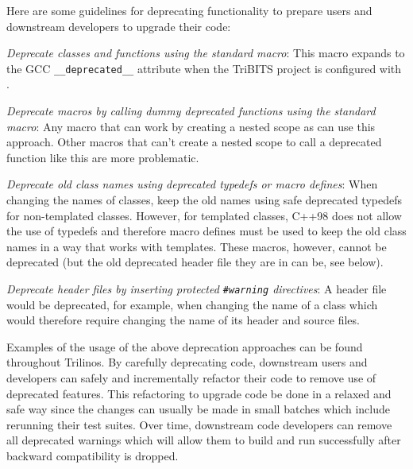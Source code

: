 \documentclass[11pt]{SANDreport}
\begin{document}
Here are some guidelines for deprecating functionality to prepare users and downstream developers to upgrade their code:

\begin{compactitem}

{}\item\textit{Deprecate classes and functions using the standard {} macro}: This macro expands to the GCC {}\texttt{\_\_deprecated\_\_} attribute when the TriBITS project is configured with {}.

{}\item\textit{Deprecate macros by calling dummy deprecated functions using the standard {} macro}: Any macro that can work by creating a nested scope as {} can use this approach.  Other macros that can't create a nested scope to call a deprecated function like this are more problematic.

{}\item\textit{Deprecate old class names using deprecated typedefs or macro defines}: When changing the names of classes, keep the old names using safe deprecated typedefs for non-templated classes.  However, for templated classes, C++98 does not allow the use of typedefs and therefore macro defines must be used to keep the old class names in a way that works with templates.  These macros, however, cannot be deprecated (but the old deprecated header file they are in can be, see below).

{}\item\textit{Deprecate header files by inserting protected {}\texttt{\#warning} directives}: A header file would be deprecated, for example, when changing the name of a class which would therefore require changing the name of its header and source files.

\end{compactitem}

Examples of the usage of the above deprecation approaches can be found throughout Trilinos.  By carefully deprecating code, downstream users and developers can safely and incrementally refactor their code to remove use of deprecated features.  This refactoring to upgrade code be done in a relaxed and safe way since the changes can usually be made in small batches which include rerunning their test suites.  Over time, downstream code developers can remove all deprecated warnings which will allow them to build and run successfully after backward compatibility is dropped.
\end{document}
